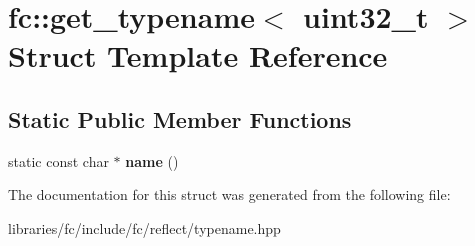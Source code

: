 \hypertarget{structfc_1_1get__typename_3_01uint32__t_01_4}{}\section{fc\+:\+:get\+\_\+typename$<$ uint32\+\_\+t $>$ Struct Template Reference}
\label{structfc_1_1get__typename_3_01uint32__t_01_4}
\subsection*{Static Public Member Functions}
\begin{DoxyCompactItemize}
\item 
\mbox{\label{structfc_1_1get__typename_3_01uint32__t_01_4_a5994130e502619ecf8c18a2915262dea}} 
static const char $\ast$ {\bfseries name} ()
\end{DoxyCompactItemize}


The documentation for this struct was generated from the following file\+:\begin{DoxyCompactItemize}
\item 
libraries/fc/include/fc/reflect/typename.\+hpp\end{DoxyCompactItemize}
